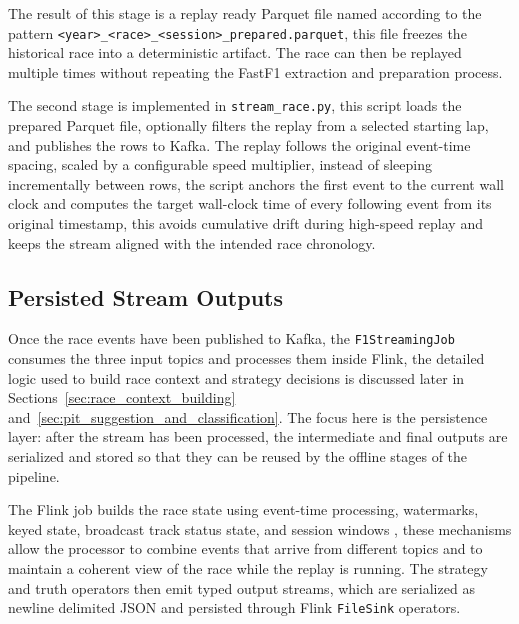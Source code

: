 The result of this stage is a replay ready Parquet file named according to the pattern \texttt{<year>\_<race>\_<session>\_prepared.parquet}, this file freezes the historical
race into a deterministic artifact. The race can then be replayed multiple times without repeating the FastF1 extraction and preparation process.

The second stage is implemented in \texttt{stream\_race.py}, this script loads the prepared Parquet file, optionally filters the replay from a selected starting lap, and
publishes the rows to Kafka. The replay follows the original event-time spacing, scaled by a configurable speed multiplier, instead of sleeping incrementally between rows,
the script anchors the first event to the current wall clock and computes the target wall-clock time of every following event from its original timestamp, this avoids cumulative
drift during high-speed replay and keeps the stream aligned with the intended race chronology.

\subsection{Persisted Stream Outputs}
\label{sec:persisted_stream_outputs}

Once the race events have been published to Kafka, the \texttt{F1StreamingJob} consumes the three input topics and processes them inside Flink, the detailed logic used
to build race context and strategy decisions is discussed later in Sections~\ref{sec:race_context_building} and~\ref{sec:pit_suggestion_and_classification}. The focus here
is the persistence layer: after the stream has been processed, the intermediate and final outputs are serialized and stored so that they can be reused by the offline stages
of the pipeline.

The Flink job builds the race state using event-time processing, watermarks, keyed state, broadcast track status state, and session windows \cite{akidau2015dataflow,carbone2015flink}, 
these mechanisms allow the
processor to combine events that arrive from different topics and to maintain a coherent view of the race while the replay is running. The strategy and truth operators
then emit typed output streams, which are serialized as newline delimited JSON and persisted through Flink \texttt{FileSink} operators.

